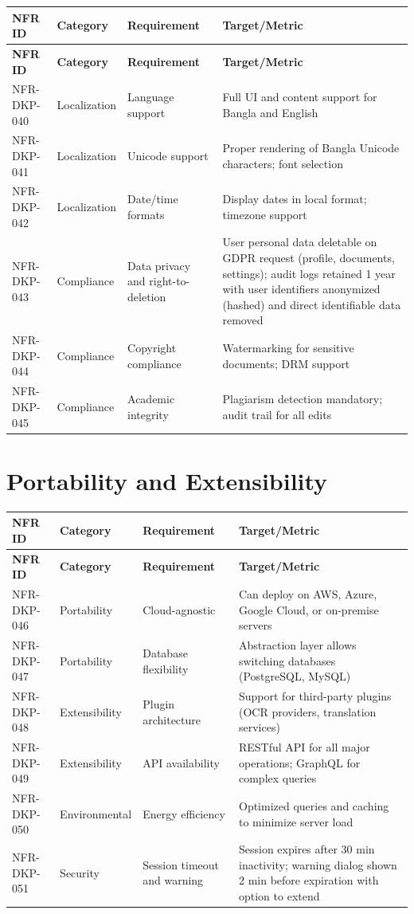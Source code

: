\documentclass[12pt,a4paper]{report}
\begin{document}
\begin{longtable}{|p{2cm}|p{3cm}|p{5.5cm}|p{3.5cm}|}
\hline
\textbf{NFR ID} & \textbf{Category} & \textbf{Requirement} & \textbf{Target/Metric} \\ \hline
\endfirsthead
\hline
\textbf{NFR ID} & \textbf{Category} & \textbf{Requirement} & \textbf{Target/Metric} \\ \hline
\endhead
NFR-DKP-040 & Localization & Language support & Full UI and content support for Bangla and English \\ \hline
NFR-DKP-041 & Localization & Unicode support & Proper rendering of Bangla Unicode characters; font selection \\ \hline
NFR-DKP-042 & Localization & Date/time formats & Display dates in local format; timezone support \\ \hline
NFR-DKP-043 & Compliance & Data privacy and right-to-deletion & User personal data deletable on GDPR request (profile, documents, settings); audit logs retained 1 year with user identifiers anonymized (hashed) and direct identifiable data removed \\ \hline
NFR-DKP-044 & Compliance & Copyright compliance & Watermarking for sensitive documents; DRM support \\ \hline
NFR-DKP-045 & Compliance & Academic integrity & Plagiarism detection mandatory; audit trail for all edits \\ \hline
\end{longtable}

\section{Portability and Extensibility}

\begin{longtable}{|p{2cm}|p{3cm}|p{5.5cm}|p{3.5cm}|}
\hline
\textbf{NFR ID} & \textbf{Category} & \textbf{Requirement} & \textbf{Target/Metric} \\ \hline
\endfirsthead
\hline
\textbf{NFR ID} & \textbf{Category} & \textbf{Requirement} & \textbf{Target/Metric} \\ \hline
\endhead
NFR-DKP-046 & Portability & Cloud-agnostic & Can deploy on AWS, Azure, Google Cloud, or on-premise servers \\ \hline
NFR-DKP-047 & Portability & Database flexibility & Abstraction layer allows switching databases (PostgreSQL, MySQL) \\ \hline
NFR-DKP-048 & Extensibility & Plugin architecture & Support for third-party plugins (OCR providers, translation services) \\ \hline
NFR-DKP-049 & Extensibility & API availability & RESTful API for all major operations; GraphQL for complex queries \\ \hline
NFR-DKP-050 & Environmental & Energy efficiency & Optimized queries and caching to minimize server load \\ \hline
NFR-DKP-051 & Security & Session timeout and warning & Session expires after 30 min inactivity; warning dialog shown 2 min before expiration with option to extend \\ \hline
\end{longtable}
\end{document}
